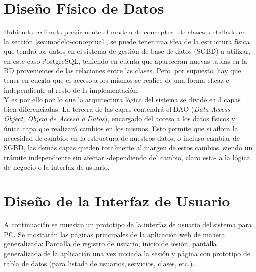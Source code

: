 \vspace{10mm}


\section{Diseño Fí­sico de Datos}

Habiendo realizado previamente el modelo de conceptual de clases, detallado en la sección \ref{sec:modelo-conceptual}, se puede tener una idea de la estructura física que tendrá los datos en el sistema de gestión de base de datos (SGBD) a utilizar, en este caso PostgreSQL, teniendo en cuenta que aparecerán nuevas tablas en la BD provenientes de las relaciones entre las clases. Pero, por supuesto, hay que tener en cuenta que el acceso a los mismos se realice de una forma eficaz e independiente al resto de la implementación.\\ 

Y es por ello por lo que la arquitectura lógica del sistema se divide en 3 capas bien diferenciadas. La tercera de las capas contendrá el DAO (\textit{Data Access Object, Objeto de Acceso a Datos}), encargado del acceso a los datos físicos y única capa que realizará cambios en los mismos. Esto permite que si aflora la necesidad de cambios en la estructura de nuestros datos, o incluso cambiar de SGBD, las demás capas queden totalmente al margen de estos cambios, siendo un trámite independiente sin afectar -dependiendo del cambio, claro está- a la lógica de negocio o la interfaz de usuario. 


\section{Diseño de la Interfaz de Usuario} 

A continuación se muestra un prototipo de la interfaz de usuario del sistema para PC. Se mostrarán las páginas principales de la aplicación web de manera generalizada: Pantalla de registro de usuario, inicio de sesión, pantalla generalizada de la aplicación una vez iniciada la sesión y página con prototipo de tabla de datos (para listado de usuarios, servicios, clases, etc.). 


\vspace{10mm}

